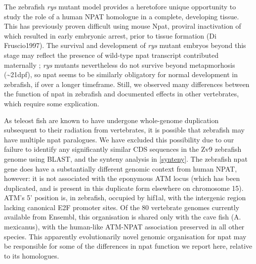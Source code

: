 The zebrafish \textit{rys} mutant model provides a heretofore unique opportunity to study the role of a human NPAT homologue in a complete, developing tissue. This has previously proven difficult using mouse Npat, proviral inactivation of which resulted in early embryonic arrest, prior to tissue formation (Di Fruscio1997). The survival and development of \textit{rys} mutant embryos beyond this stage may reflect the presence of wild-type npat transcript contributed maternally \cite{Harvey2013}; \textit{rys} mutants nevertheless do not survive beyond metapmorhosis (\textasciitilde{}21dpf), so npat seems to be similarly obligatory for normal development in zebrafish, if over a longer timeframe. Still, we observed many differences between the function of npat in zebrafish and documented effects in other vertebrates, which require some explication.

As teleost fish are known to have undergone whole-genome duplication subsequent to their radiation from vertebrates, it is possible that zebrafish may have multiple npat paralogues. We have excluded this possibility due to our failure to identify any significantly similar CDS sequences in the Zv9 zebrafish genome using BLAST, and the synteny analysis in \autoref{synteny}. The zebrafish npat gene does have a substantially different genomic context from human NPAT, however: it is not associated with the eponymous ATM locus (which has been duplicated, and is present in this duplicate form elsewhere on chromosome 15). ATM’s 5’ position is, in zebrafish, occupied by hif1al, with the intergenic region lacking canonical E2F promoter sites. Of the 80 vertebrate genomes currently available from Ensembl, this organisation is shared only with the cave fish (A. mexicanus), with the human-like ATM-NPAT association preserved in all other species. This apparently evolutionarily novel genomic organisation for npat may be responsible for some of the differences in npat function we report here, relative to its homologues.

